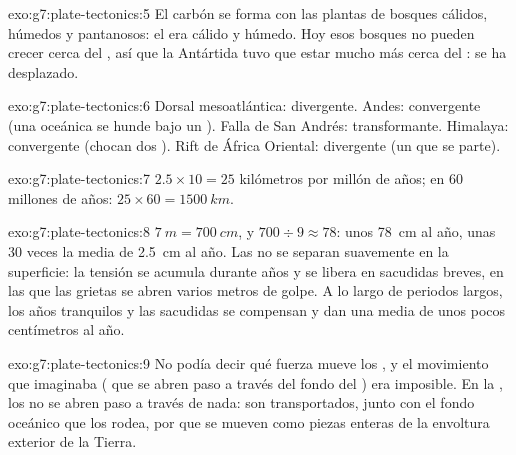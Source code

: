\begin{solution}{exo:g7:plate-tectonics:5}
El carbón se forma con las plantas de bosques cálidos, húmedos y
pantanosos: el  era cálido y húmedo. Hoy esos bosques no pueden crecer
cerca del , así que la Antártida tuvo que estar mucho más cerca del
: se ha desplazado.
\end{solution}

\begin{solution}{exo:g7:plate-tectonics:6}
Dorsal mesoatlántica: divergente. Andes: convergente (una  oceánica se
hunde bajo un ). Falla de San Andrés: transformante. Himalaya:
convergente (chocan dos ). Rift de África Oriental: divergente
(un  que se parte).
\end{solution}

\begin{solution}{exo:g7:plate-tectonics:7}
$2.5 \times 10 = 25$ kilómetros por millón de años; en 60 millones de años:
$25 \times 60 = \qty{1500}{km}$.
\end{solution}

\begin{solution}{exo:g7:plate-tectonics:8}
$\qty{7}{m} = \qty{700}{cm}$, y $700 \div 9 \approx 78$: unos
\qty{78}{cm} al año, unas 30 veces la media de \qty{2.5}{cm} al año. Las
 no se separan suavemente en la superficie: la tensión se acumula
durante años y se libera en sacudidas breves, en las que las grietas se
abren varios metros de golpe. A lo largo de periodos largos, los años
tranquilos y las sacudidas se compensan y dan una media de unos pocos
centímetros al año.
\end{solution}

\begin{solution}{exo:g7:plate-tectonics:9}
No podía decir qué fuerza mueve los , y el movimiento que
imaginaba ( que se abren paso a través del fondo del ) era
imposible. En la , los  no se abren paso a
través de nada: son transportados, junto con el fondo oceánico que los
rodea, por  que se mueven como piezas enteras de la envoltura
exterior de la Tierra.
\end{solution}

